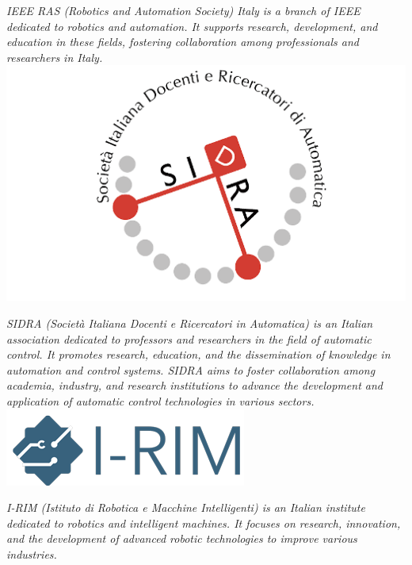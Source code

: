 \documentclass[
	openany, %
	parskip=full, %
	12pt, %
	a4paper, %
]{conferencebooklet} %
\begin{document}
\begin{multicols*}{2}
    \textit{IEEE RAS (Robotics and Automation Society) Italy is a branch of IEEE dedicated to robotics and automation. It supports research, development, and education in these fields, fostering collaboration among professionals and researchers in Italy.} \\

    \hfill\includegraphics[width=\sponsorscaling\linewidth]{logos/sidra.png}\hspace*{\fill}

    \textit{SIDRA (Società Italiana Docenti e Ricercatori in Automatica) is an Italian association dedicated to professors and researchers in the field of automatic control. It promotes research, education, and the dissemination of knowledge in automation and control systems. SIDRA aims to foster collaboration among academia, industry, and research institutions to advance the development and application of automatic control technologies in various sectors.} \\
    
    \hfill\includegraphics[width=\sponsorscaling\linewidth]{logos/irim.png}\hspace*{\fill}

    \textit{I-RIM (Istituto di Robotica e Macchine Intelligenti) is an Italian institute dedicated to robotics and intelligent machines. It focuses on research, innovation, and the development of advanced robotic technologies to improve various industries.} \\
    

\end{multicols*}
\end{document}

